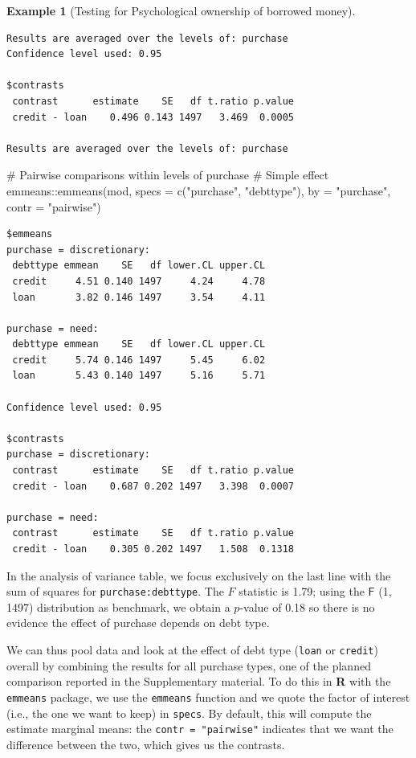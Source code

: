 \documentclass[
  11pt,
  letterpaper,
]{scrbook}
\newenvironment{Shaded}{\begin{snugshade}}{\end{snugshade}}
\newcommand{\AttributeTok}[1]{\textcolor[rgb]{0.40,0.45,0.13}{#1}}
\newcommand{\CommentTok}[1]{\textcolor[rgb]{0.37,0.37,0.37}{#1}}
\newcommand{\FunctionTok}[1]{\textcolor[rgb]{0.28,0.35,0.67}{#1}}
\newcommand{\NormalTok}[1]{\textcolor[rgb]{0.00,0.23,0.31}{#1}}
\newcommand{\SpecialCharTok}[1]{\textcolor[rgb]{0.37,0.37,0.37}{#1}}
\newcommand{\StringTok}[1]{\textcolor[rgb]{0.13,0.47,0.30}{#1}}
\theoremstyle{definition}
\newtheorem{example}{Example}[chapter]
\theoremstyle{definition}
\theoremstyle{remark}
\begin{document}
\begin{example}[Testing for Psychological ownership of borrowed
money]
\begin{verbatim}
Results are averaged over the levels of: purchase 
Confidence level used: 0.95 

$contrasts
 contrast      estimate    SE   df t.ratio p.value
 credit - loan    0.496 0.143 1497   3.469  0.0005

Results are averaged over the levels of: purchase 
\end{verbatim}

\begin{Shaded}
\begin{Highlighting}[]
\CommentTok{\# Pairwise comparisons within levels of purchase}
\CommentTok{\# Simple effect}
\NormalTok{emmeans}\SpecialCharTok{::}\FunctionTok{emmeans}\NormalTok{(mod, }
                 \AttributeTok{specs =} \FunctionTok{c}\NormalTok{(}\StringTok{"purchase"}\NormalTok{, }\StringTok{"debttype"}\NormalTok{),}
                 \AttributeTok{by =} \StringTok{"purchase"}\NormalTok{,}
                 \AttributeTok{contr =} \StringTok{"pairwise"}\NormalTok{)}
\end{Highlighting}
\end{Shaded}

\begin{verbatim}
$emmeans
purchase = discretionary:
 debttype emmean    SE   df lower.CL upper.CL
 credit     4.51 0.140 1497     4.24     4.78
 loan       3.82 0.146 1497     3.54     4.11

purchase = need:
 debttype emmean    SE   df lower.CL upper.CL
 credit     5.74 0.146 1497     5.45     6.02
 loan       5.43 0.140 1497     5.16     5.71

Confidence level used: 0.95 

$contrasts
purchase = discretionary:
 contrast      estimate    SE   df t.ratio p.value
 credit - loan    0.687 0.202 1497   3.398  0.0007

purchase = need:
 contrast      estimate    SE   df t.ratio p.value
 credit - loan    0.305 0.202 1497   1.508  0.1318
\end{verbatim}

In the analysis of variance table, we focus exclusively on the last line
with the sum of squares for \texttt{purchase:debttype}. The \(F\)
statistic is 1.79; using the \(\mathsf{F}\) (1, 1497) distribution as
benchmark, we obtain a \(p\)-value of 0.18 so there is no evidence the
effect of purchase depends on debt type.

We can thus pool data and look at the effect of debt type (\texttt{loan}
or \texttt{credit}) overall by combining the results for all purchase
types, one of the planned comparison reported in the Supplementary
material. To do this in \textbf{R} with the \texttt{emmeans} package, we
use the \texttt{emmeans} function and we quote the factor of interest
(i.e., the one we want to keep) in \texttt{specs}. By default, this will
compute the estimate marginal means: the \texttt{contr\ =\ "pairwise"}
indicates that we want the difference between the two, which gives us
the contrasts.


\end{example}
\end{document}
